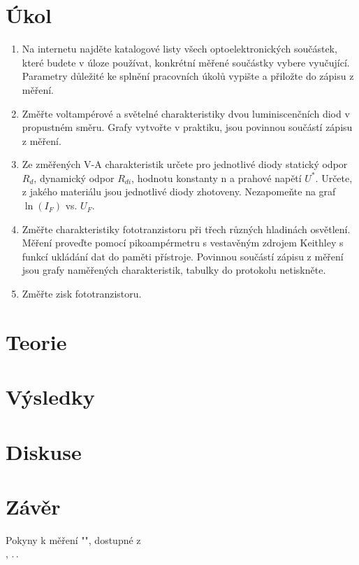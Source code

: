 \documentclass{protokol}
\begin{document}
  \section*{Úkol}

    \begin{enumerate}
      \item Na internetu najděte katalogové listy všech optoelektronických součástek, které budete v úloze používat, konkrétní měřené součástky vybere vyučující. Parametry důležité ke splnění pracovních úkolů vypište a přiložte do zápisu z měření.
      \item Změřte voltampérové a světelné charakteristiky dvou luminiscenčních diod v propustném směru. Grafy vytvořte v praktiku, jsou povinnou součástí zápisu z měření.
      \item Ze změřených V-A charakteristik určete pro jednotlivé diody statický odpor $R_d$, dynamický odpor $R_{di}$, hodnotu konstanty n a prahové napětí $U^*$. Určete, z jakého materiálu jsou jednotlivé diody zhotoveny. Nezapomeňte na graf $\ln(I_F)$ vs. $U_F$.
      \item Změřte charakteristiky fototranzistoru při třech různých hladinách osvětlení. Měření proveďte pomocí pikoampérmetru s vestavěným zdrojem Keithley s funkcí ukládání dat do paměti přístroje. Povinnou součástí zápisu z měření jsou grafy naměřených charakteristik, tabulky do protokolu netiskněte.
      \item Změřte zisk fototranzistoru.
    \end{enumerate}

  \section*{Teorie}

    

  \section*{Výsledky}

  \section*{Diskuse}

  \section*{Závěr}

  \begin{thebibliography}{}

    Pokyny k měření "", dostupné z\\ \url{}, .\,.\,
  
  \end{thebibliography}
\end{document}
